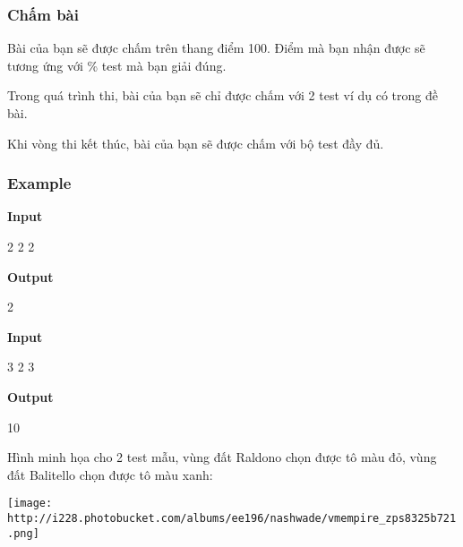\subsubsection{   Chấm bài  }

   Bài của bạn sẽ được chấm trên thang điểm 100. Điểm mà bạn nhận được sẽ tương ứng với \% test mà bạn giải đúng.  

   Trong quá trình thi, bài của bạn sẽ chỉ được chấm với 2 test ví dụ có trong đề bài.  

   Khi vòng thi kết thúc, bài của bạn sẽ được chấm với bộ test đầy đủ.  

\subsubsection{   Example  }

\textbf{    Input   }

   2 2 2  

\textbf{    Output   }

   2  



\textbf{    Input   }

   3 2 3   \textbf{
\\}

\textbf{    Output   }

   10   \textbf{
\\}



   Hình minh họa cho 2 test mẫu, vùng đất Raldono chọn được tô màu đỏ, vùng đất Balitello chọn được tô màu xanh:   \textbf{
\\}


\texttt{[image: http://i228.photobucket.com/albums/ee196/nashwade/vmempire\_zps8325b721.png]}